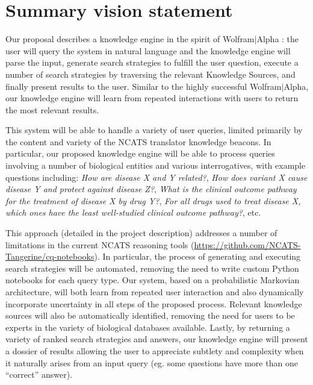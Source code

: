 \documentclass[11pt,notitlepage]{article}
\begin{document}
\thispagestyle{plain}

\section{Summary vision statement}
Our proposal describes a knowledge engine in the spirit of Wolfram$|$Alpha \cite{Wolframalpha}: the user will query the system in natural language and the knowledge engine will parse the input, generate search strategies to fulfill the user question, execute a number of search strategies by traversing the relevant Knowledge Sources, and finally present results to the user. Similar to the highly successful Wolfram$|$Alpha, our knowledge engine will learn from repeated interactions with users to return the most relevant results. 

This system will be able to handle a variety of user queries, limited primarily by the content and variety of the NCATS translator knowledge beacons. In particular, our proposed knowledge engine will be able to process queries involving a number of biological entities and various interrogatives, with example questions including: \textit{How are disease X and Y related?}, \textit{How does variant X cause disease Y and protect against disease Z?}, \textit{What is the clinical outcome pathway for the treatment of disease X by drug Y?}, \textit{For all drugs used to treat disease X, which ones have the least well-studied clinical outcome pathway?}, etc.

This approach (detailed in the project description) addresses a number of limitations in the current NCATS reasoning tools (\url{https://github.com/NCATS-Tangerine/cq-notebooks}). In particular, the process of generating and executing search strategies will be automated, removing the need to write custom Python notebooks for each query type. Our system, based on a probabilistic Markovian architecture, will both learn from repeated user interaction and also dynamically incorporate uncertainty in all steps of the proposed process. Relevant knowledge sources will also be automatically identified, removing the need for users to be experts in the variety of biological databases available. Lastly, by returning a variety of ranked search strategies and answers, our knowledge engine will present a dossier of results allowing the user to appreciate subtlety and complexity when it naturally arises from an input query (eg. some questions have more than one ``correct'' answer). 
\end{document}
